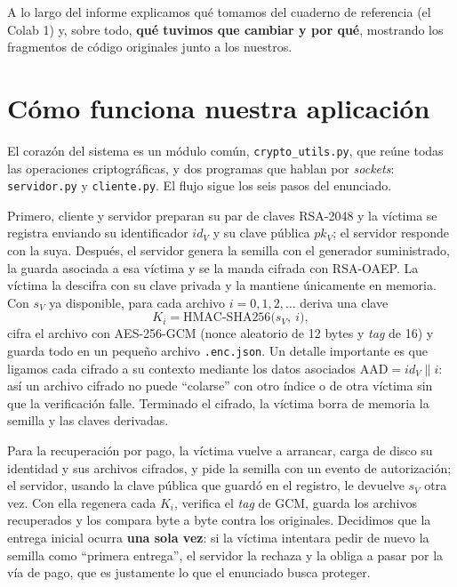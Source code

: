 \documentclass[11pt,a4paper]{article}
\begin{document}
A lo largo del informe explicamos qué tomamos del cuaderno de referencia (el
Colab 1) y, sobre todo, \textbf{qué tuvimos que cambiar y por qué}, mostrando los
fragmentos de código originales junto a los nuestros.

\section{Cómo funciona nuestra aplicación}

El corazón del sistema es un módulo común, \texttt{crypto\_utils.py}, que reúne
todas las operaciones criptográficas, y dos programas que hablan por
\emph{sockets}: \texttt{servidor.py} y \texttt{cliente.py}. El flujo sigue los seis
pasos del enunciado.

Primero, cliente y servidor preparan su par de claves RSA-2048 y la víctima se
registra enviando su identificador $id_V$ y su clave pública $pk_V$; el servidor
responde con la suya. Después, el servidor genera la semilla con el generador
suministrado, la guarda asociada a esa víctima y se la manda cifrada con
RSA-OAEP. La víctima la descifra con su clave privada y la mantiene únicamente en
memoria. Con $s_V$ ya disponible, para cada archivo $i=0,1,2,\dots$ deriva una
clave
\[
K_i = \mathrm{HMAC\text{-}SHA256}\bigl(s_V,\ i\bigr),
\]
cifra el archivo con AES-256-GCM (nonce aleatorio de 12 bytes y \emph{tag} de 16)
y guarda todo en un pequeño archivo \texttt{.enc.json}. Un detalle importante es
que ligamos cada cifrado a su contexto mediante los datos asociados
$\mathrm{AAD} = id_V \parallel i$: así un archivo cifrado no puede ``colarse'' con
otro índice o de otra víctima sin que la verificación falle. Terminado el cifrado,
la víctima borra de memoria la semilla y las claves derivadas.

Para la recuperación por pago, la víctima vuelve a arrancar, carga de disco su
identidad y sus archivos cifrados, y pide la semilla con un evento de
autorización; el servidor, usando la clave pública que guardó en el registro,
le devuelve $s_V$ otra vez. Con ella regenera cada $K_i$, verifica el \emph{tag}
de GCM, guarda los archivos recuperados y los compara byte a byte contra los
originales. Decidimos que la entrega inicial ocurra \textbf{una sola vez}: si la
víctima intentara pedir de nuevo la semilla como ``primera entrega'', el servidor
la rechaza y la obliga a pasar por la vía de pago, que es justamente lo que el
enunciado busca proteger.

\end{document}

